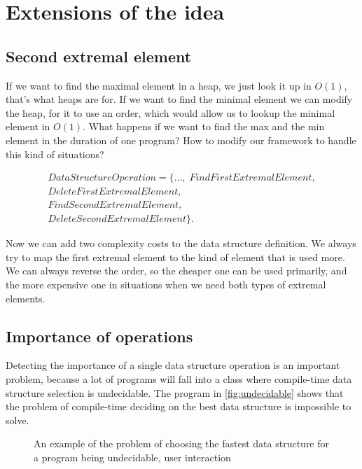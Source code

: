 \documentclass[a4paper,11pt]{article}
\begin{document}
        \clearpage


\pagebreak

\section{Extensions of the idea}

	\subsection{Second extremal element}

		If we want to find the maximal element in a heap, we just look it up in $O(1)$, that's what heaps are
		for.  If we want to find the minimal element we can modify the heap, for it to use an order, which would
		allow us to lookup the minimal element in $O(1)$.  What happens if we want to find the max and the min
		element in the duration of one program?  How to modify our framework to handle this kind of situations?

		\begin{eqnarray*}
			DataStructureOperation = \{\dots, \; FindFirstExtremalElement,\\
			DeleteFirstExtremalElement,\\
			FindSecondExtremalElement,\\
			DeleteSecondExtremalElement\}.
		\end{eqnarray*}

        Now we can add two complexity costs to the data structure definition. We always try to map the first extremal
        element to the kind of element that is used more. We can always reverse the order, so the cheaper one can be
        used primarily, and the more expensive one in situations when we need both types of extremal elements.

	\subsection{Importance of operations} \label{sub:importance}

		Detecting the importance of a single data structure operation is an important problem, because a lot of
		programs will fall into a class where compile-time data structure selection is undecidable. The
        program in \autoref{fig:undecidable} shows that the problem of compile-time deciding on the best data structure
        is impossible to solve.

        \begin{figure}[!h]
			

			\caption{An example of the problem of choosing the fastest data structure for a program being
			undecidable, user interaction}

			\label{fig:undecidable}
		\end{figure}
\end{document}
